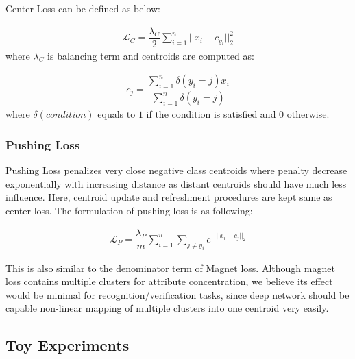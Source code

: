 \documentclass[10pt,twocolumn,letterpaper]{article}
\begin{document}
Center Loss can be defined as below:

\begin{align}
\mathcal{L}_C = \dfrac{\lambda_C}{2} \sum_{i=1}^n ||x_i - c_{y_i} ||_2^2
\end{align}
where $\lambda_C$ is balancing term and centroids are computed as:

\begin{align}
c_j = \dfrac{\sum_{i=1}^n \delta(y_i = j)x_i}{\sum_{i=1}^n \delta(y_i=j)}
\end{align}
where $\delta(condition)$ equals to $1$ if the condition is satisfied and $0$ otherwise.


\subsubsection{Pushing Loss} Pushing Loss penalizes very close negative class centroids where penalty decrease exponentially with increasing distance as distant centroids should have much less influence. Here, centroid update and refreshment procedures are kept same as center loss. The formulation of pushing loss is as following:

\vspace{-0.2in}
\begin{align}
\mathcal{L}_P = \dfrac{\lambda_P}{m} \sum_{i=1}^n \sum_{j \neq y_i} e^{-||x_i - c_j ||_2}
\end{align}

This is also similar to the denominator term of Magnet loss\cite{rippel2015metric}. Although magnet loss contains multiple clusters for attribute concentration, we believe its effect would be minimal for recognition/verification tasks, since deep network should be capable non-linear mapping of multiple clusters into one centroid very easily.

\subsection{Toy Experiments}
\end{document}

